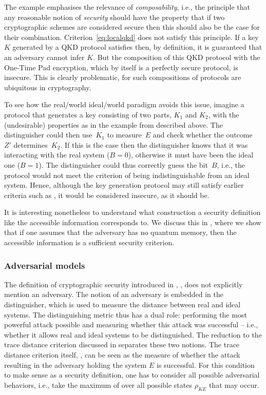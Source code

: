  The example emphasises the relevance of \emph{composability}, i.e.,
 the principle that any reasonable notion of \emph{security} should
 have the property that if two cryptographic schemes are considered
 secure then this should also be the case for their
 combination. Criterion~\eqref{eq:localqkd} does not satisfy this
 principle. If a key $K$ generated by a QKD protocol satisfies
  then, by definition, it is guaranteed that an
 adversary cannot infer $K$.  But the composition of this QKD protocol
 with the One-Time Pad encryption, which by itself is a perfectly
 secure protocol, is insecure. This is clearly problematic, for such
 compositions of protocols are ubiquitous in cryptography.

 To see how the real\-/world ideal\-/world paradigm avoids this issue,
 imagine a protocol that generates a key consisting of two parts,
 $K_1$ and $K_2$, with the (undesirable) properties as in the example
 from \textcite{KRBM07} described above. The distinguisher could then
 use~$K_1$ to measure~$E$ and check whether the outcome~$Z'$
 determines~$K_2$.  If this is the case then the distinguisher knows
 that it was interacting with the real system ($B=0$), otherwise it
 must have been the ideal one ($B=1$). The distinguisher could thus
 correctly guess the bit~$B$, i.e., the protocol would not meet the
 criterion of being indistinguishable from an ideal system. Hence,
 although the key generation protocol may still satisfy earlier
 criteria such as , it would be considered
 insecure, as it should be.

 It is interesting nonetheless to understand what construction a
 security definition like the accessible information corresponds
 to. We discuss this in , where we
 show that if one assumes that the adversary has no quantum memory,
 then the accessible information is a sufficient security criterion.
 
\subsubsection{Adversarial models}
\label{sec:qkd.other.models}

The definition of cryptographic security introduced in , , does not explicitly mention an adversary. The notion of an adversary is embedded in the distinguisher, which is used to measure the distance between real and ideal systems. The distinguishing metric thus has a dual role: performing the most powerful attack possible and measuring whether this attack was successful \--- i.e., whether it allows real and ideal systems to be distinguished. The reduction to the trace distance criterion discussed in  separates these two notions. The trace distance criterion itself, , can be seen as the measure of whether the attack resulting in the adversary holding the system $E$ is successful. For this condition to make sense as a security definition, one has to consider all possible adversarial behaviors, i.e., take the maximum of  over all possible states $\rho_{KE}$ that may occur.

